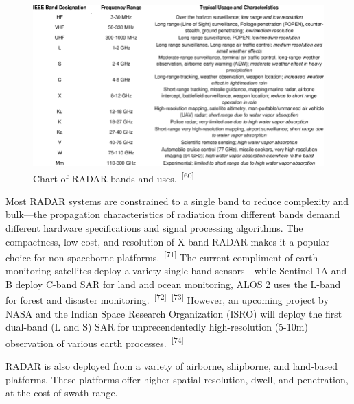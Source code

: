 \documentclass{article}
\begin{document}

\begin{figure}
    \centering
    \includegraphics[width=1\linewidth]{images/radar-bands.png}
    \caption{Chart of RADAR bands and uses.~\textsuperscript{[60]}}
    \label{figure19}
\end{figure}


\par{Most RADAR systems are constrained to a single band to reduce complexity and bulk---the propagation characteristics of radiation from different bands demand different hardware specifications and signal processing algorithms. The compactness, low-cost, and resolution of X-band RADAR makes it a popular choice for non-spaceborne platforms.~\textsuperscript{[71]} The current compliment of earth monitoring satellites deploy a variety single-band sensors---while Sentinel 1A and B deploy C-band SAR for land and ocean monitoring, ALOS 2 uses the L-band for forest and disaster monitoring.~\textsuperscript{[72]}~\textsuperscript{[73]} However, an upcoming project by NASA and the Indian Space Research Organization (ISRO) will deploy the first dual-band (L and S) SAR for unprecendentedly high-resolution (5-10m) observation of various earth processes.~\textsuperscript{[74]}}


\par{RADAR is also deployed from a variety of airborne, shipborne, and land-based platforms. These platforms offer higher spatial resolution, dwell, and penetration, at the cost of swath range.}


\end{document}
